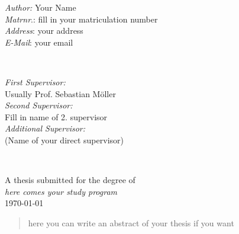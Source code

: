 \begin{titlepage}
\begin{minipage}{0.5\textwidth}
\begin{flushleft} \large
\emph{Author:} Your Name\\
\emph{Matrnr}.: fill in your matriculation number\\
\emph{Address}: your address \\
\emph{E-Mail}: your email\\
\end{flushleft}
\end{minipage}
~
\begin{minipage}{0.43\textwidth}
\begin{flushright} \large
\emph{First Supervisor:} \\
Usually Prof. Sebastian Möller\\
\emph{Second Supervisor:} \\
Fill in name of 2. supervisor\\
\emph{Additional Supervisor:}\\
(Name of your direct supervisor)
\end{flushright}
\end{minipage}\\[3cm]
\makeatother


{\large A thesis submitted for the degree of}\\[0.5cm]
{\large \emph{here comes your study program}}\\[0.5cm]
{\large \today}\\[2cm] %

\vfill %
 


\begin{abstract}
\noindent
here you can write an abstract of your thesis if you want
\end{abstract}
\vspace{1cm}

\vfill %

\end{titlepage}

